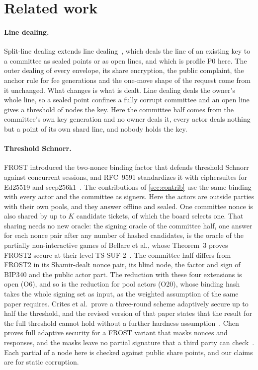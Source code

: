 \section{Related work}\label{sec:related}

\paragraph{Line dealing.} Split-line dealing extends line dealing~\cite{LD}, which deals the line of an existing key to a committee as sealed points or as open lines, and which is profile P0 here. The outer dealing of every envelope, its share encryption, the public complaint, the anchor rule for fee generations and the one-move shape of the request come from it unchanged. What changes is what is dealt. Line dealing deals the owner's whole line, so a sealed point confines a fully corrupt committee and an open line gives a threshold of nodes the key. Here the committee half comes from the committee's own key generation and no owner deals it, every actor deals nothing but a point of its own shard line, and nobody holds the key.

\paragraph{Threshold Schnorr.} FROST introduced the two-nonce binding factor that defends threshold Schnorr against concurrent sessions, and RFC~9591 standardizes it with ciphersuites for Ed25519 and secp256k1~\cite{FROST,RFC9591}. The contributions of \cref{sec:contrib} use the same binding with every actor and the committee as signers. Here the actors are outside parties with their own pools, and they answer offline and sealed. One committee nonce is also shared by up to $K$ candidate tickets, of which the board selects one. That sharing needs no new oracle: the signing oracle of the committee half, one answer for each nonce pair after any number of hashed candidates, is the oracle of the partially non-interactive games of Bellare et al., whose Theorem~3 proves FROST2 secure at their level TS-SUF-2~\cite{BTA22}. The committee half differs from FROST2 in its Shamir-dealt nonce pair, its blind node, the factor and sign of BIP340 and the public actor part. The reduction with these four extensions is open (O6), and so is the reduction for pool actors (O20), whose binding hash takes the whole signing set as input, as the weighted assumption of the same paper requires. Crites et al.\ prove a three-round scheme adaptively secure up to half the threshold, and the revised version of that paper states that the result for the full threshold cannot hold without a further hardness assumption~\cite{Sparkle}. Chen proves full adaptive security for a FROST variant that masks nonces and responses, and the masks leave no partial signature that a third party can check~\cite{Chen25}. Each partial of a node here is checked against public share points, and our claims are for static corruption.

